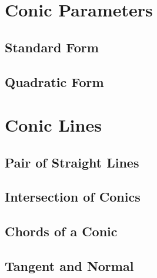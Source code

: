 \documentclass[11pt]{book}
\begin{document}
\chapter{Conic Parameters}
\section{Standard Form}

\section{Quadratic Form }


\chapter{Conic Lines}
\section{Pair of Straight Lines}
%

\section{Intersection of Conics}

\section{ Chords of a Conic}

\section{ Tangent and Normal}

%

%
%
%
\fi
\latexprintindex
\end{document}
